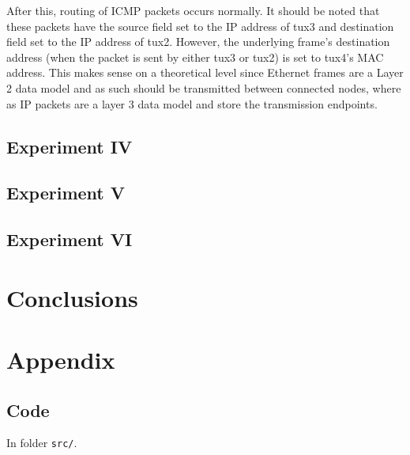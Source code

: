\documentclass[11pt,a4paper,twocolumn]{article}
\begin{document}
After this, routing of ICMP packets occurs normally. It should be noted that these packets have the source field set to the IP address of tux3 and destination field set to the IP address of tux2. However, the underlying frame's destination address (when the packet is sent by either tux3 or tux2) is set to tux4's MAC address.
This makes sense on a theoretical level since Ethernet frames are a Layer 2 data model and as such should be transmitted between connected nodes, where as IP packets are a layer 3 data model and store the transmission endpoints.
\subsection{Experiment IV}

\subsection{Experiment V}

\subsection{Experiment VI}

\section{Conclusions}

\onecolumn
\appendix
\section{Appendix}

\subsection{Code}

\noindent In folder \lstinline{src/}.
\end{document}
